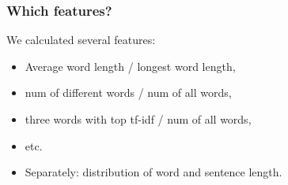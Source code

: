 \documentclass[unknownkeysallowed]{beamer}
\begin{document}
\begin{frame}
\frametitle{Which features?}
We calculated several features:
\medskip
\begin{itemize}
\smallskip
\item Average word length / longest word length,
\bigskip
\item num of different words / num of all words,
\bigskip
\item three words with top tf-idf / num of all words,
\bigskip
\item etc.
\bigskip
\item Separately: distribution of word and sentence length.
\end{itemize}

\end{frame}
\end{document}
